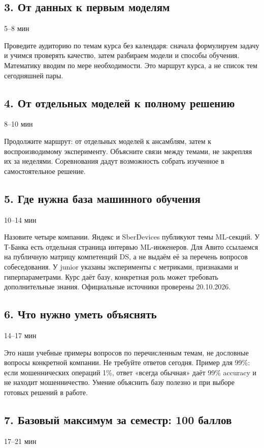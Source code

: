 \documentclass[11pt,a4paper]{article}
\newcommand{\timing}[1]{\hfill{\small\color{blue}#1}}
\begin{document}
\subsection{3. От данных к первым моделям}
\timing{5–8 мин}

Проведите аудиторию по темам курса без календаря: сначала формулируем задачу и учимся проверять качество, затем разбираем модели и способы обучения. Математику вводим по мере необходимости. Это маршрут курса, а не список тем сегодняшней пары.

\subsection{4. От отдельных моделей к полному решению}
\timing{8–10 мин}

Продолжите маршрут: от отдельных моделей к ансамблям, затем к воспроизводимому эксперименту. Объясните связи между темами, не закрепляя их за неделями. Соревнования дадут возможность собрать изученное в самостоятельное решение.

\subsection{5. Где нужна база машинного обучения}
\timing{10–14 мин}

Назовите четыре компании. Яндекс и SberDevices публикуют темы ML-секций. У Т-Банка есть отдельная страница интервью ML-инженеров. Для Авито ссылаемся на публичную матрицу компетенций DS, а не выдаём её за перечень вопросов собеседования. У junior указаны эксперименты с метриками, признаками и гиперпараметрами. Курс даёт базу, конкретная роль может требовать дополнительные знания. Официальные источники проверены 20.10.2026.

\subsection{6. Что нужно уметь объяснять}
\timing{14–17 мин}

Это наши учебные примеры вопросов по перечисленным темам, не дословные вопросы конкретной компании. Не требуйте ответов сегодня. Пример для 99\%: если мошеннических операций 1\%, ответ «всегда обычная» даёт 99\% accuracy и не находит мошенничество. Умение объяснить базу полезно и при выборе готовых решений в работе.

\subsection{7. Базовый максимум за семестр: 100 баллов}
\timing{17–21 мин}
\end{document}
